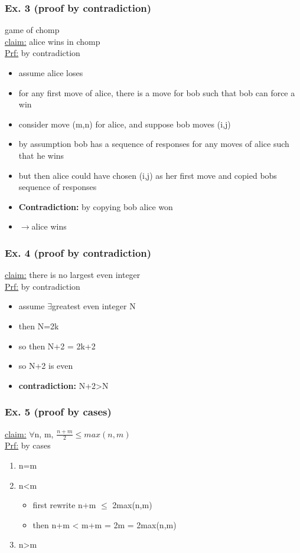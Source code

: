 \documentclass[a4paper]{article}
\newcommand{\ra}{$\rightarrow$}
\newcommand{\fa}{$\forall$}
\newcommand{\te}{$\exists$}
\begin{document}
\begin{itemize}
      \subsubsection{Ex. 3 (proof by contradiction)}
        game of chomp\\
        \underline{claim:} alice wins in chomp\\
        \underline{Prf:} by contradiction
        \begin{itemize}
          \item assume alice loses
          \item for any first move of alice, there is a move for bob such that bob
          can force a win
          \item consider move (m,n) for alice, and suppose bob moves (i,j)
          \item by assumption bob has a sequence of responses for any moves of
          alice such that he wins
          \item but then alice could have chosen (i,j) as her first move and
          copied bobs sequence of responses
          \item \textbf{Contradiction:} by copying bob alice won
          \item \ra alice wins
        \end{itemize}
      \subsubsection{Ex. 4 (proof by contradiction)}
        \underline{claim:} there is no largest even integer\\
        \underline{Prf:} by contradiction
        \begin{itemize}
          \item assume \te greatest even integer N
          \item then N=2k
          \item so then N+2 = 2k+2
          \item so N+2 is even
          \item \textbf{contradiction:} N+2>N
        \end{itemize}
      \subsubsection{Ex. 5 (proof by cases)}
        \underline{claim:} \fa n, m, $\frac{n+m}{2} \le max(n,m)$\\
        \underline{Prf:} by cases
        \begin{enumerate}
          \item n=m
          \item n<m
          \begin{itemize}
            \item first rewrite n+m $\le$ 2max(n,m)
            \item then n+m < m+m = 2m = 2max(n,m)
          \end{itemize}
          \item n>m
        \end{enumerate}

\end{itemize}
\end{document}

